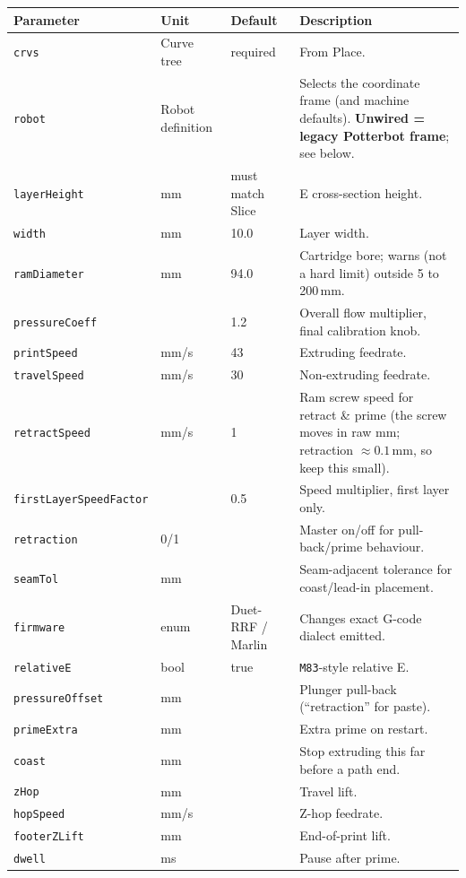 \documentclass[11pt]{article}
\newcommand{\param}[1]{\texttt{#1}}
\begin{document}
\begin{longtable}{@{}p{3.4cm}p{1.8cm}p{1.6cm}p{6.5cm}@{}}
\toprule
\textbf{Parameter} & \textbf{Unit} & \textbf{Default} & \textbf{Description} \\
\midrule
\endhead
\param{crvs} & Curve tree & required & From Place. \\
\param{robot} & Robot definition & & Selects the coordinate frame (and machine defaults). \textbf{Unwired = legacy Potterbot frame}; see below. \\
\param{layerHeight} & mm & must match Slice & E cross-section height. \\
\param{width} & mm & 10.0 & Layer width. \\
\param{ramDiameter} & mm & 94.0 & Cartridge bore; warns (not a hard limit) outside 5 to 200\,mm. \\
\param{pressureCoeff} & & 1.2 & Overall flow multiplier, final calibration knob. \\
\param{printSpeed} & mm/s & 43 & Extruding feedrate. \\
\param{travelSpeed} & mm/s & 30 & Non-extruding feedrate. \\
\param{retractSpeed} & mm/s & 1 & Ram screw speed for retract \& prime (the screw moves in raw mm; retraction $\approx 0.1$\,mm, so keep this small). \\
\param{firstLayerSpeedFactor} & & 0.5 & Speed multiplier, first layer only. \\
\param{retraction} & 0/1 & & Master on/off for pull-back/prime behaviour. \\
\param{seamTol} & mm & & Seam-adjacent tolerance for coast/lead-in placement. \\
\param{firmware} & enum & Duet-RRF / Marlin & Changes exact G-code dialect emitted. \\
\param{relativeE} & bool & true & \texttt{M83}-style relative E. \\
\param{pressureOffset} & mm & & Plunger pull-back (``retraction'' for paste). \\
\param{primeExtra} & mm & & Extra prime on restart. \\
\param{coast} & mm & & Stop extruding this far before a path end. \\
\param{zHop} & mm & & Travel lift. \\
\param{hopSpeed} & mm/s & & Z-hop feedrate. \\
\param{footerZLift} & mm & & End-of-print lift. \\
\param{dwell} & ms & & Pause after prime. \\

\end{longtable}
\end{document}
